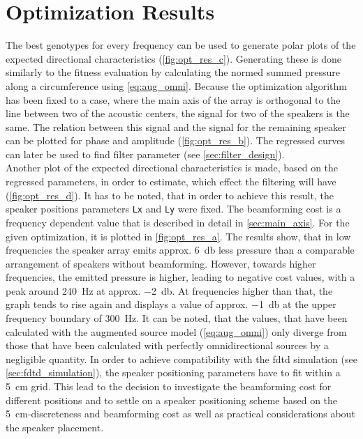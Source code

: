\section{Optimization Results}\label{sec:opt_result}
The best genotypes for every frequency can be used to generate polar plots of the expected directional characteristics (\autoref{fig:opt_res_c}). Generating these is done similarly to the fitness evaluation by calculating the normed summed pressure along a circumference using \autoref{eq:aug_omni}.
Because the optimization algorithm has been fixed to a case, where the main axis of the array is orthogonal to the line between two of the acoustic centers, the signal for two of the speakers is the same. The relation between this signal and the signal for the remaining speaker can be plotted for phase and amplitude (\autoref{fig:opt_res_b}). The regressed curves can later be used to find filter parameter (see \autoref{sec:filter_design}).\\
Another plot of the expected directional characteristics is made, based on the regressed parameters, in order to estimate, which effect the filtering will have (\autoref{fig:opt_res_d}).
It has to be noted, that in order to achieve this result, the speaker positions parameters \textcolor{green3}{\texttt{Lx}} and \textcolor{green3}{\texttt{Ly}} were fixed.  The beamforming cost is a frequency dependent value that is described in detail in \autoref{sec:main_axis}. For the given optimization, it is plotted in \autoref{fig:opt_res_a}. The results show, that in low frequencies the speaker array emits approx. \SI{6}{\decibel} less pressure than a comparable arrangement of speakers without beamforming. However, towards higher frequencies, the emitted pressure is higher, leading to negative cost values, with a peak around \SI{240}{\hertz} at approx. \SI{-2}{\decibel}. At frequencies higher than that, the graph tends to rise again and displays a value of approx. \SI{-1}{\decibel} at the upper frequency boundary of \SI{300}{\hertz}. It can be noted, that the values, that have been calculated with the augmented source model (\autoref{eq:aug_omni}) only diverge from those that have been calculated with perfectly omnidirectional sources by a negligible quantity.
In order to achieve compatibility with the \gls{fdtd} simulation (see \autoref{sec:fdtd_simulation}), the speaker positioning parameters have to fit within a \SI{5}{\centi\meter} grid. This lead to the decision to investigate the beamforming cost for different positions and to settle on a speaker positioning scheme based on the \SI{5}{\centi\meter}-discreteness and beamforming cost as well as practical considerations about the speaker placement.
